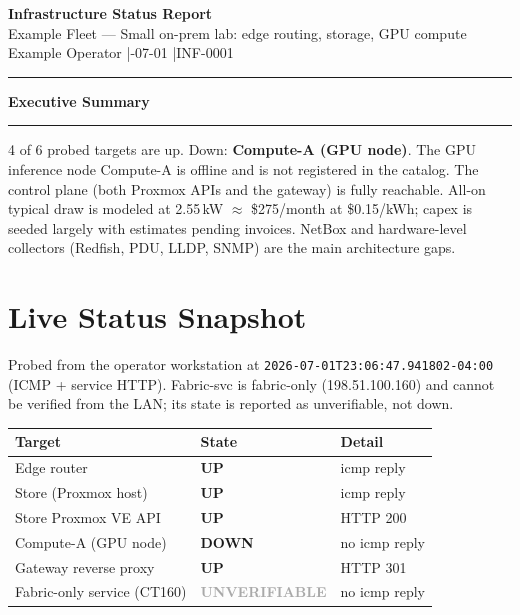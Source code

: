 \documentclass[11pt]{article}
\renewcommand{\fleetheading}[1]{%
  \par\vspace{1.2em}%
  {\large\bfseries\color{primary}#1}\par
  \vspace{0.2em}\textcolor{lightgray}{\rule{\linewidth}{1.2pt}}\par
  \vspace{0.6em}%
}
\begin{document}
\thispagestyle{firstpage}

\vspace*{1.2em}
{\Huge\bfseries\color{primary} Infrastructure Status Report}\\[0.4em]
{\large\color{secondary} Example Fleet — Small on-prem lab: edge routing, storage, GPU compute}\\[0.3em]
{\color{darkgray}\small Example Operator \quad|-07-01 \quad|\quad INF-0001}

\vspace{0.5em}\textcolor{lightgray}{\rule{\linewidth}{1.2pt}}\vspace{1em}

\fleetheading{Executive Summary}
4 of 6 probed targets are up. Down: \textcolor{accent}{\textbf{Compute-A (GPU node)}}.
The GPU inference node Compute-A is offline and is not registered in the
catalog. The control plane (both Proxmox APIs and the gateway) is fully
reachable. All-on typical draw is modeled at
2.55\,kW $\approx$
\$275/month at \$0.15/kWh; capex is
seeded largely with estimates pending invoices. NetBox and hardware-level
collectors (Redfish, PDU, LLDP, SNMP) are the main architecture gaps.


\section{Live Status Snapshot}
Probed from the operator workstation at \texttt{2026-07-01T23:06:47.941802-04:00} (ICMP + service HTTP).
Fabric-svc is fabric-only (198.51.100.160) and cannot be verified from the
LAN; its state is reported as unverifiable, not down.

\begin{tabularx}{\textwidth}{X l l}
\toprule
\textbf{Target} & \textbf{State} & \textbf{Detail} \\
\midrule
Edge router & \textcolor{success}{\textbf{UP}} & icmp reply \\
Store (Proxmox host) & \textcolor{success}{\textbf{UP}} & icmp reply \\
Store Proxmox VE API & \textcolor{success}{\textbf{UP}} & HTTP 200 \\
Compute-A (GPU node) & \textcolor{accent}{\textbf{DOWN}} & no icmp reply \\
Gateway reverse proxy & \textcolor{success}{\textbf{UP}} & HTTP 301 \\
Fabric-only service (CT160) & \textcolor{darkgray}{\textbf{UNVERIFIABLE}} & no icmp reply \\
\bottomrule
\end{tabularx}
\end{document}
